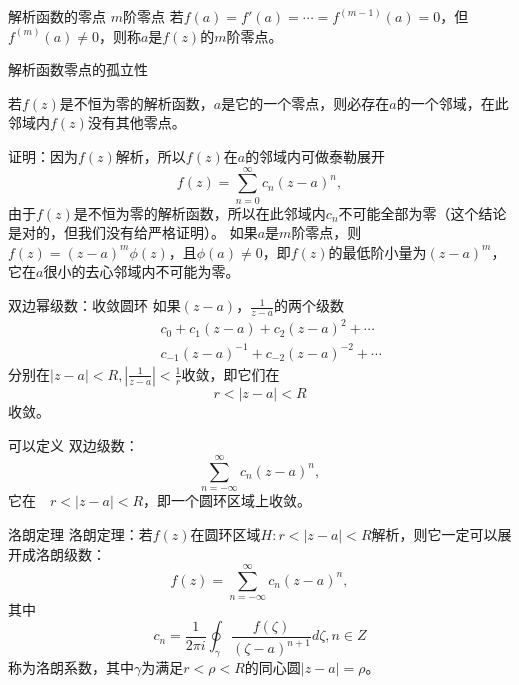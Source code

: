 \documentclass[11pt]{beamer}
\newcommand{\kong}[1][0.5]{\vspace{#1cm}}
\begin{document}
\begin{frame}{解析函数的零点}
{\color{blue}$m$阶零点}
若$f(a)=f'(a)=\cdots=f^{(m-1)}(a)=0$，但$f^{(m)}(a) \neq 0$，则称$a$是$f(z)$的$m$阶零点。

\kong[0.5]
{\color{blue}解析函数零点的孤立性}

若$f(z)$是不恒为零的解析函数，$a$是它的一个零点，则必存在$a$的一个邻域，在此邻域内$f(z)$没有其他零点。

证明：因为$f(z)$解析，所以$f(z)$在$a$的邻域内可做泰勒展开
\begin{equation}
f(z) = \sum_{n=0}^{\infty} c_n (z-a)^n,
\end{equation}
由于$f(z)$是不恒为零的解析函数，所以在此邻域内$c_n$不可能全部为零（这个结论是对的，但我们没有给严格证明）。
如果$a$是$m$阶零点，则$f(z) = (z-a)^m \phi(z)$，且$\phi(a) \neq 0$，即$f(z)$的最低阶小量为$(z-a)^m$，它在$a$很小的去心邻域内不可能为零。
\end{frame}

\begin{frame}{双边幂级数：收敛圆环}
如果$(z-a)$，$\frac{1}{z-a}$的两个级数
\begin{eqnarray}
&& c_0 + c_1(z-a) + c_2(z-a)^2 + \cdots \\
&& c_{-1}(z-a)^{-1} + c_{-2} (z-a)^{-2} + \cdots
\end{eqnarray}
分别在$|z-a|<R, |\frac{1}{z-a}|<\frac{1}{r}$收敛，即它们在
\begin{equation}
r < |z-a| < R
\end{equation}
收敛。

\kong[1]
可以定义{\color{blue} 双边级数}：
\begin{equation}
\sum_{n=-\infty}^{\infty} c_n (z-a)^n,
\end{equation}
它在　$r < |z-a| < R$，即一个圆环区域上收敛。
\end{frame}

\begin{frame}{洛朗定理}
洛朗定理：若$f(z)$在圆环区域$H: r< |z-a|<R$解析，则它一定可以展开成{\color{blue}洛朗级数}：
\begin{equation}
f(z) = \sum_{n=-\infty}^{\infty} c_n (z-a)^n,
\end{equation}
其中
\begin{equation}
c_n = \frac{1}{2\pi i} \oint_\gamma \frac{f(\zeta)}{(\zeta-a)^{n+1}} d\zeta, n \in Z
\end{equation}
称为{\color{blue}洛朗系数}，其中$\gamma$为满足$r<\rho<R$的同心圆$|z-a|=\rho$。
\end{frame}
\end{document}
